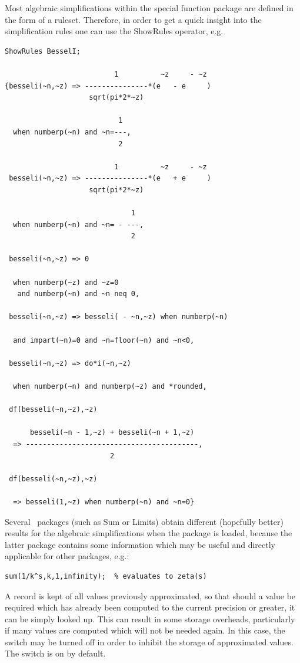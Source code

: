 Most algebraic simplifications within the special function package
are defined in the form of a \REDUCE{} ruleset. Therefore, in order to
get a quick insight into the simplification rules one can use the
ShowRules operator, e.g.
\begin{verbatim}
ShowRules BesselI;

                          1          ~z     - ~z
{besseli(~n,~z) => ---------------*(e   - e     )
                    sqrt(pi*2*~z)

                           1
  when numberp(~n) and ~n=---,
                           2

                          1          ~z     - ~z
 besseli(~n,~z) => ---------------*(e   + e     )
                    sqrt(pi*2*~z)

                              1
  when numberp(~n) and ~n= - ---,
                              2

 besseli(~n,~z) => 0

  when numberp(~z) and ~z=0
   and numberp(~n) and ~n neq 0,

 besseli(~n,~z) => besseli( - ~n,~z) when numberp(~n)

  and impart(~n)=0 and ~n=floor(~n) and ~n<0,

 besseli(~n,~z) => do*i(~n,~z)

  when numberp(~n) and numberp(~z) and *rounded,

 df(besseli(~n,~z),~z)

      besseli(~n - 1,~z) + besseli(~n + 1,~z)
  => -----------------------------------------,
                         2

 df(besseli(~n,~z),~z)

  => besseli(1,~z) when numberp(~n) and ~n=0}
\end{verbatim}
Several \REDUCE\ packages (such as Sum or Limits) obtain different
(hopefully better)
results for the algebraic simplifications when the  package
is loaded, because the latter package contains some information which
may be useful and directly applicable for other packages, e.g.:

\begin{verbatim}
sum(1/k^s,k,1,infinity);  % evaluates to zeta(s)
\end{verbatim}

A record is kept of all values previously approximated, so that should a
value be required which has already been computed to the current
precision or greater, it can be simply looked up.  This can result in
some storage overheads, particularly if many values are computed which
will not be needed again.  In this case, the switch  may be
turned off in order to inhibit the storage of approximated values.  The
switch is on by default.

